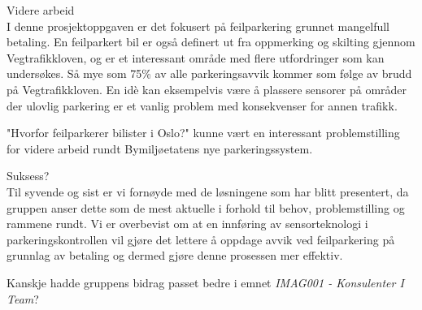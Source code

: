 \documentclass[xetex]{beamer}
\begin{document}
\begin{frame}
	{\footnotesize\alert{Videre arbeid}}\\
	I denne prosjektoppgaven er det fokusert på feilparkering grunnet mangelfull betaling. En 
feilparkert bil er også definert ut fra oppmerking og skilting gjennom Vegtrafikkloven, og 
er et interessant område med flere utfordringer som kan undersøkes. Så mye som 75\% 
av alle parkeringsavvik kommer som følge av brudd på Vegtrafikkloven.
En idè kan eksempelvis være å plassere sensorer på områder der ulovlig parkering er et vanlig problem med konsekvenser for annen trafikk.

	"\alert{Hvorfor feilparkerer bilister i Oslo?}" kunne vært en interessant problemstilling for videre 
arbeid rundt Bymiljøetatens nye parkeringssystem.

	{\footnotesize\alert{Suksess?}}\\
	Til syvende og sist er vi fornøyde med de løsningene som har blitt presentert, da 
gruppen anser dette som de mest aktuelle i forhold til behov, problemstilling og rammene 
rundt. Vi er overbevist om at en innføring av sensorteknologi i parkeringskontrollen vil 
gjøre det lettere å oppdage avvik ved feilparkering på grunnlag av betaling og dermed 
gjøre denne prosessen mer effektiv.

	Kanskje hadde gruppens bidrag passet bedre i emnet \emph{\alert{IMAG001 - Konsulenter I Team}}?

\end{frame}
\end{document}
